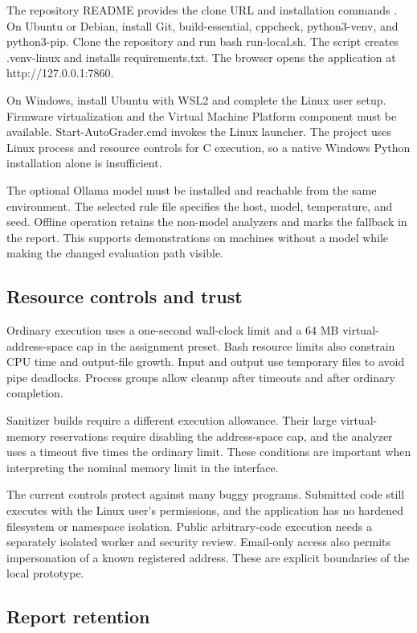 \documentclass[conference]{IEEEtran}
\begin{document}
The repository README provides the clone URL and installation commands \cite{ref2}. On Ubuntu or Debian, install Git, build-essential, cppcheck, python3-venv, and python3-pip. Clone the repository and run bash run-local.sh. The script creates .venv-linux and installs requirements.txt. The browser opens the application at http://127.0.0.1:7860.


On Windows, install Ubuntu with WSL2 and complete the Linux user setup. Firmware virtualization and the Virtual Machine Platform component must be available. Start-AutoGrader.cmd invokes the Linux launcher. The project uses Linux process and resource controls for C execution, so a native Windows Python installation alone is insufficient.


The optional Ollama model must be installed and reachable from the same environment. The selected rule file specifies the host, model, temperature, and seed. Offline operation retains the non-model analyzers and marks the fallback in the report. This supports demonstrations on machines without a model while making the changed evaluation path visible.


\subsection{Resource controls and trust}

Ordinary execution uses a one-second wall-clock limit and a 64 MB virtual-address-space cap in the assignment preset. Bash resource limits also constrain CPU time and output-file growth. Input and output use temporary files to avoid pipe deadlocks. Process groups allow cleanup after timeouts and after ordinary completion.


Sanitizer builds require a different execution allowance. Their large virtual-memory reservations require disabling the address-space cap, and the analyzer uses a timeout five times the ordinary limit. These conditions are important when interpreting the nominal memory limit in the interface.


The current controls protect against many buggy programs. Submitted code still executes with the Linux user's permissions, and the application has no hardened filesystem or namespace isolation. Public arbitrary-code execution needs a separately isolated worker and security review. Email-only access also permits impersonation of a known registered address. These are explicit boundaries of the local prototype.


\subsection{Report retention}
\end{document}
